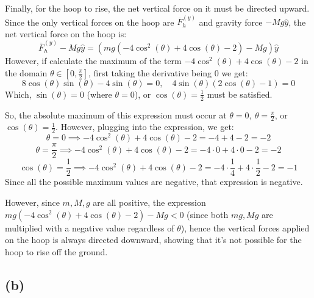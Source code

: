\documentclass{article}
\newcommand{\bF}{\overline{F}}
\begin{document}
\hfil

Finally, for the hoop to rise, the net vertical force on it must be directed upward. Since the only vertical forces on the hoop are $\bF_h^{(y)}$ and gravity force $-Mg\hat{y}$, the net vertical force on the hoop is:
$$\bF_h^{(y)}-Mg\hat{y} = \left(mg(-4\cos^2(\theta)+4\cos(\theta)-2)-Mg\right)\hat{y}$$
However, if calculate the maximum of the term $-4\cos^2(\theta)+4\cos(\theta)-2$ in the domain $\theta\in [0,\frac{\pi}{2}]$, first taking the derivative being $0$ we get:
$$8\cos(\theta)\sin(\theta)-4\sin(\theta) = 0,\quad 4\sin(\theta)(2\cos(\theta)-1)=0$$
Which, $\sin(\theta)=0$ (where $\theta=0$), or $\cos(\theta)=\frac{1}{2}$ must be satisfied.

So, the absolute maximum of this expression must occur at $\theta=0,\ \theta=\frac{\pi}{2}$, or $\cos(\theta)=\frac{1}{2}$. However, plugging into the expression, we get:
$$\theta=0\implies -4\cos^2(\theta)+4\cos(\theta)-2 = -4+4-2 = -2$$
$$\theta=\frac{\pi}{2}\implies -4\cos^2(\theta)+4\cos(\theta)-2=-4\cdot 0+4\cdot 0-2 = -2$$
$$\cos(\theta)=\frac{1}{2}\implies -4\cos^2(\theta)+4\cos(\theta)-2 = -4\cdot\frac{1}{4}+4\cdot\frac{1}{2}-2 = -1$$
Since all the possible maximum values are negative, that expression is negative.

However, since $m,M,g$ are all positive, the expression $mg(-4\cos^2(\theta)+4\cos(\theta)-2)-Mg<0$ (since both $mg, Mg$ are multiplied with a negative value regardless of $\theta$), hence the vertical forces applied on the hoop is always directed downward, showing that it's not possible for the hoop to rise off the ground.

\subsection*{(b)}


\break
\end{document}
